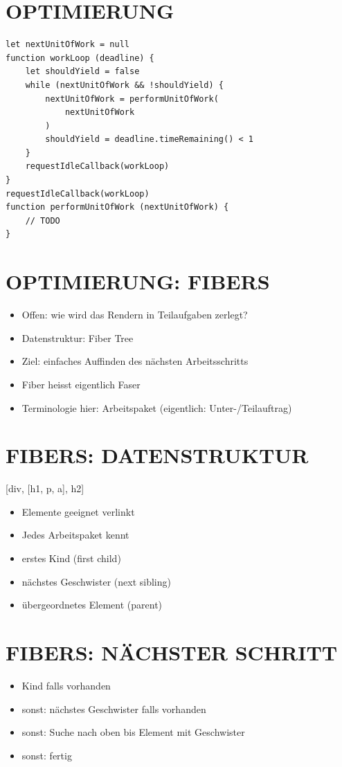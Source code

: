 \documentclass[10pt]{article}
\begin{document}
\section*{OPTIMIERUNG}
\begin{verbatim}
let nextUnitOfWork = null
function workLoop (deadline) {
    let shouldYield = false
    while (nextUnitOfWork && !shouldYield) {
        nextUnitOfWork = performUnitOfWork(
            nextUnitOfWork
        )
        shouldYield = deadline.timeRemaining() < 1
    }
    requestIdleCallback(workLoop)
}
requestIdleCallback(workLoop)
function performUnitOfWork (nextUnitOfWork) {
    // TODO
}
\end{verbatim}

\section*{OPTIMIERUNG: FIBERS}
\begin{itemize}
  \item Offen: wie wird das Rendern in Teilaufgaben zerlegt?
  \item Datenstruktur: Fiber Tree
  \item Ziel: einfaches Auffinden des nächsten Arbeitsschritts
  \item Fiber heisst eigentlich Faser
  \item Terminologie hier: Arbeitspaket (eigentlich: Unter-/Teilauftrag)
\end{itemize}

\section*{FIBERS: DATENSTRUKTUR}
[div, [h1, p, a], h2]

\begin{itemize}
  \item Elemente geeignet verlinkt
  \item Jedes Arbeitspaket kennt
  \item erstes Kind (first child)
  \item nächstes Geschwister (next sibling)
  \item übergeordnetes Element (parent)
\end{itemize}

\section*{FIBERS: NÄCHSTER SCHRITT}
\begin{itemize}
  \item Kind falls vorhanden
  \item sonst: nächstes Geschwister falls vorhanden
  \item sonst: Suche nach oben bis Element mit Geschwister
  \item sonst: fertig
\end{itemize}
\end{document}
